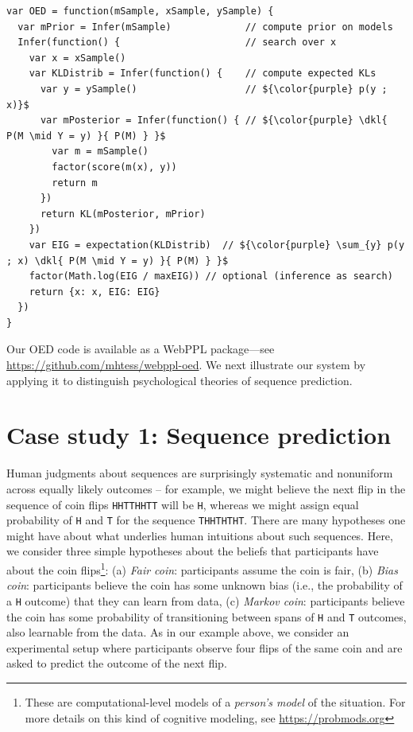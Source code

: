 \documentclass{article}
\newcommand{\dkl}{D_\mathrm{KL}\infdivx}
\begin{document}
\begin{lstlisting}[mathescape, label={code:oed-pp}, caption = {OED implementation. For clarity, we have omitted some book-keeping details.}]
var OED = function(mSample, xSample, ySample) {
  var mPrior = Infer(mSample)             // compute prior on models
  Infer(function() {                      // search over x
    var x = xSample()
    var KLDistrib = Infer(function() {    // compute expected KLs
      var y = ySample()                   // ${\color{purple} p(y ; x)}$
      var mPosterior = Infer(function() { // ${\color{purple} \dkl{ P(M \mid Y = y) }{ P(M) } }$
        var m = mSample()
        factor(score(m(x), y))
        return m
      })
      return KL(mPosterior, mPrior)
    })
    var EIG = expectation(KLDistrib)  // ${\color{purple} \sum_{y} p(y ; x) \dkl{ P(M \mid Y = y) }{ P(M) } }$
    factor(Math.log(EIG / maxEIG)) // optional (inference as search)
    return {x: x, EIG: EIG}
  })
}
\end{lstlisting}
Our OED code is available as a WebPPL package---see \url{https://github.com/mhtess/webppl-oed}.
We next illustrate our system by applying it to distinguish psychological theories of sequence prediction.

\section{Case study 1: Sequence prediction}
\label{s:tutorial}

Human judgments about sequences are surprisingly systematic and nonuniform across equally likely outcomes -- for example, we might believe the next flip in the  sequence of coin flips \lstinline{HHTTHHTT} will be \lstinline{H}, whereas we might assign equal probability of \lstinline{H} and \lstinline{T} for the sequence \lstinline{THHTHTHT}.
There are many hypotheses one might have about what underlies human intuitions about such sequences.
Here, we consider three simple hypotheses about the beliefs that participants have about the coin flips\footnote{These are computational-level models of a \emph{person's model} of the situation. For more details on this kind of cognitive modeling, see \url{https://probmods.org}}: (a) \emph{Fair coin}: participants assume the coin is fair, (b) \emph{Bias coin}: participants believe the coin has some unknown bias (i.e., the probability of a \lstinline{H} outcome) that they can learn from data, (c) \emph{Markov coin}: participants believe the coin has some probability of transitioning between spans of \lstinline{H} and \lstinline{T} outcomes, also learnable from the data.
As in our example above, we consider an experimental setup where participants observe four flips of the same coin and are asked to predict the outcome of the next flip.
\end{document}
